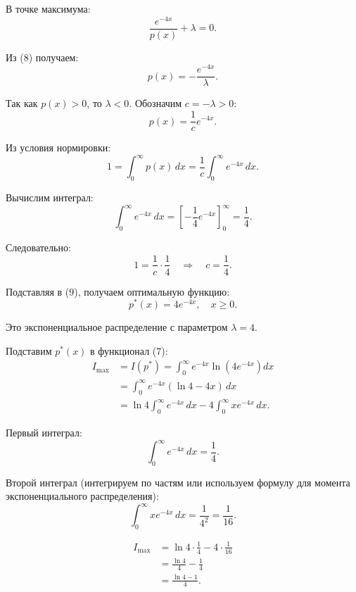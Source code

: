 \documentclass[pract]{SCWorks}
\begin{document}
    В точке максимума:
    \begin{equation}
    \frac{e^{-4x}}{p(x)} + \lambda = 0.
    \end{equation}

    Из (8) получаем:
    \[
    p(x) = -\frac{e^{-4x}}{\lambda}.
    \]

    Так как $p(x) > 0$, то $\lambda < 0$. Обозначим $c = -\lambda > 0$:
    \begin{equation}
    p(x) = \frac{1}{c} e^{-4x}.
    \end{equation}

    Из условия нормировки:
    \[
    1 = \int_{0}^{\infty} p(x)\, dx = \frac{1}{c} \int_{0}^{\infty} e^{-4x}\, dx.
    \]

    Вычислим интеграл:
    \[
    \int_{0}^{\infty} e^{-4x}\, dx = \left[-\frac{1}{4} e^{-4x}\right]_{0}^{\infty} = \frac{1}{4}.
    \]

    Следовательно:
    \[
    1 = \frac{1}{c} \cdot \frac{1}{4} \quad \Rightarrow \quad c = \frac{1}{4}.
    \]

    Подставляя в (9), получаем оптимальную функцию:
    \begin{equation}
    \boxed{p^*(x) = 4e^{-4x}, \quad x \ge 0}.
    \end{equation}

    Это экспоненциальное распределение с параметром $\lambda = 4$.

    Подставим $p^*(x)$ в функционал (7):
    \[
    \begin{aligned}
    I_{\max} &= I(p^*) = \int_{0}^{\infty} e^{-4x} \ln\left(4e^{-4x}\right) dx \\
    &= \int_{0}^{\infty} e^{-4x} (\ln 4 - 4x)\, dx \\
    &= \ln 4 \int_{0}^{\infty} e^{-4x}\, dx - 4 \int_{0}^{\infty} x e^{-4x}\, dx.
    \end{aligned}
    \]

    Первый интеграл:
    \[
    \int_{0}^{\infty} e^{-4x}\, dx = \frac{1}{4}.
    \]

    Второй интеграл (интегрируем по частям или используем формулу для момента экспоненциального распределения):
    \[
    \int_{0}^{\infty} x e^{-4x}\, dx = \frac{1}{4^2} = \frac{1}{16}.
    \]

    \[
    \begin{aligned}
    I_{\max} &= \ln 4 \cdot \frac{1}{4} - 4 \cdot \frac{1}{16} \\
    &= \frac{\ln 4}{4} - \frac{1}{4} \\
    &= \frac{\ln 4 - 1}{4}.
    \end{aligned}
    \]
\end{document}
